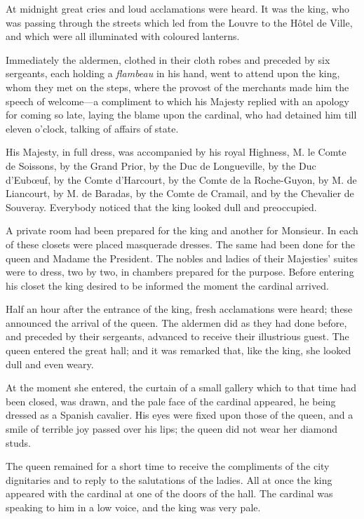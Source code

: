 At midnight great cries and loud acclamations were heard. It was the king, who was passing through the streets which led from the Louvre to the Hôtel de Ville, and which were all illuminated with coloured lanterns. 

Immediately the aldermen, clothed in their cloth robes and preceded by six sergeants, each holding a \textit{flambeau} in his hand, went to attend upon the king, whom they met on the steps, where the provost of the merchants made him the speech of welcome---a compliment to which his Majesty replied with an apology for coming so late, laying the blame upon the cardinal, who had detained him till eleven o'clock, talking of affairs of state. 

His Majesty, in full dress, was accompanied by his royal Highness, M. le Comte de Soissons, by the Grand Prior, by the Duc de Longueville, by the Duc d'Eubœuf, by the Comte d'Harcourt, by the Comte de la Roche-Guyon, by M. de Liancourt, by M. de Baradas, by the Comte de Cramail, and by the Chevalier de Souveray. Everybody noticed that the king looked dull and preoccupied. 

A private room had been prepared for the king and another for Monsieur. In each of these closets were placed masquerade dresses. The same had been done for the queen and Madame the President. The nobles and ladies of their Majesties' suites were to dress, two by two, in chambers prepared for the purpose. Before entering his closet the king desired to be informed the moment the cardinal arrived. 

Half an hour after the entrance of the king, fresh acclamations were heard; these announced the arrival of the queen. The aldermen did as they had done before, and preceded by their sergeants, advanced to receive their illustrious guest. The queen entered the great hall; and it was remarked that, like the king, she looked dull and even weary. 

At the moment she entered, the curtain of a small gallery which to that time had been closed, was drawn, and the pale face of the cardinal appeared, he being dressed as a Spanish cavalier. His eyes were fixed upon those of the queen, and a smile of terrible joy passed over his lips; the queen did not wear her diamond studs. 

The queen remained for a short time to receive the compliments of the city dignitaries and to reply to the salutations of the ladies. All at once the king appeared with the cardinal at one of the doors of the hall. The cardinal was speaking to him in a low voice, and the king was very pale. 

